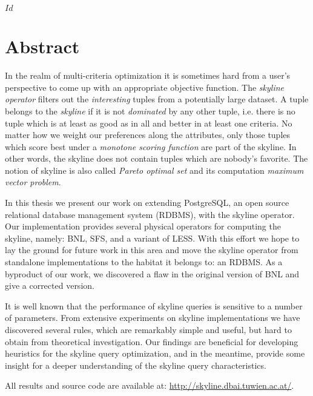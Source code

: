 
\svnInfo $Id$


\chapter*{Abstract\revision}


In the realm of multi-criteria optimization it is sometimes hard from
a user's perspective to come up with an appropriate objective
function.
%
The \emph{skyline operator} filters out the \emph{interesting} tuples
from a potentially large dataset.  A tuple belongs to the \emph{skyline} if
it is not \emph{dominated} by any other tuple, i.e. there is no tuple
which is at least as good as in all and better in at least one criteria.
%
No matter how we weight our preferences along the attributes, only
those tuples which score best under a \emph{monotone scoring function} are
part of the skyline.
%
In other words, the skyline does not contain tuples which
are nobody's favorite.
%
The notion of skyline is also called \emph{Pareto optimal set} and its
computation \emph{maximum vector problem}.


In this thesis we present our work on extending PostgreSQL, an open
source relational database management system (RDBMS), with the skyline operator.
%
Our implementation provides several physical operators for computing
the skyline, namely: BNL, SFS, and a variant of LESS.
%
With this effort we hope to lay the ground for future work in this
area and move the skyline operator from standalone implementations to
the habitat it belongs to: an RDBMS.
%
As a byproduct of our work, we discovered a flaw in the original version of BNL and give
a corrected version.

It is well known that the performance of skyline queries is sensitive
to a number of parameters.  
%
From extensive experiments on skyline implementations we have
discovered several rules, which are remarkably simple and useful, but
hard to obtain from theoretical investigation.
%
Our findings are beneficial for developing heuristics for the skyline
query optimization, and in the meantime, provide some insight for a
deeper understanding of the skyline query characteristics.

All results and source code are available at:
\url{http://skyline.dbai.tuwien.ac.at/}.
